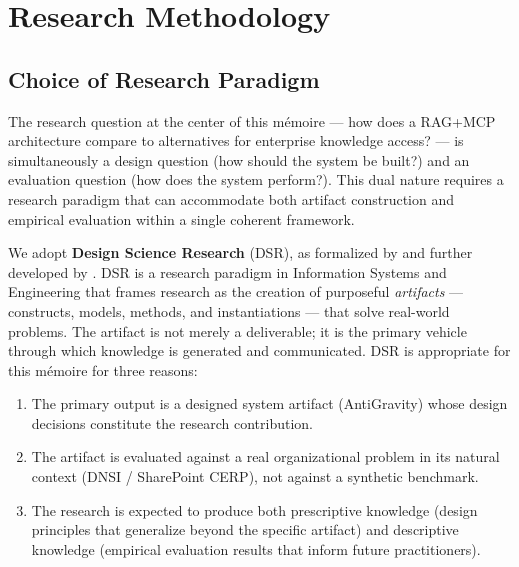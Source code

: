 \chapter{Research Methodology}
\label{chap:methodology}

\section{Choice of Research Paradigm}
\label{sec:method-paradigm}

The research question at the center of this mémoire — how does a RAG+MCP architecture compare to alternatives for enterprise knowledge access? — is simultaneously a design question (how should the system be built?) and an evaluation question (how does the system perform?). This dual nature requires a research paradigm that can accommodate both artifact construction and empirical evaluation within a single coherent framework.

We adopt \textbf{Design Science Research} (DSR), as formalized by \citet{Hevner2004} and further developed by \citet{Peffers2007}. DSR is a research paradigm in Information Systems and Engineering that frames research as the creation of purposeful \textit{artifacts} — constructs, models, methods, and instantiations — that solve real-world problems. The artifact is not merely a deliverable; it is the primary vehicle through which knowledge is generated and communicated. DSR is appropriate for this mémoire for three reasons:

\begin{enumerate}
  \item The primary output is a designed system artifact (AntiGravity) whose design decisions constitute the research contribution.
  \item The artifact is evaluated against a real organizational problem in its natural context (DNSI / SharePoint CERP), not against a synthetic benchmark.
  \item The research is expected to produce both prescriptive knowledge (design principles that generalize beyond the specific artifact) and descriptive knowledge (empirical evaluation results that inform future practitioners).
\end{enumerate}

